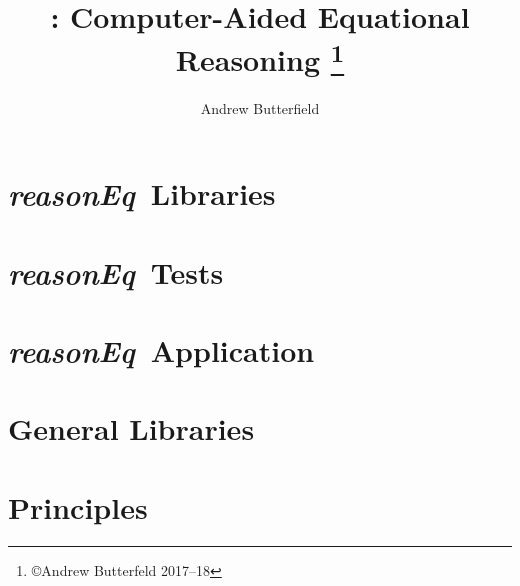 \documentclass[fleqn,10pt]{report}
\author{Andrew Butterfield}
\title{
  \reasonEq: Computer-Aided Equational Reasoning%
  \thanks{\copyright Andrew Butterfeld 2017--18}
}
\def\reasonEq{\textit{\textsf{reasonEq}}}
\begin{document}
\maketitle
\tableofcontents

\chapter{\reasonEq\ Libraries}

% 
% 
% 
\newpage

% 
% 
% 
% 

\chapter{\reasonEq\ Tests}

% 
\newpage


\chapter{\reasonEq\ Application}

% 

\chapter{General Libraries}

% 




\appendix

\chapter{Principles}

% 
\end{document}
